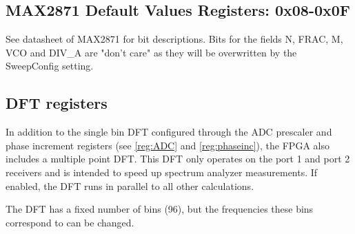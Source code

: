 \documentclass{article}
\newcommand{\bitrect}[2]{
  \begin{pgfonlayer}{foreground}
    \draw [thick] (0,0) rectangle (#1,1);
    \pgfmathsetmacro\result{#1-1}
    \foreach \x in {1,...,\result}
      \draw [thick] (\x,1) -- (\x, 0.8);
  \end{pgfonlayer}
  \bitlabels{#1}{#2}
}
\newcommand{\rwbits}[3]{
  \draw [thick] (#1,0) rectangle ++(#2,1) node[pos=0.5]{#3};
  \pgfmathsetmacro\start{#1+0.5}
  \pgfmathsetmacro\finish{#1+#2-0.5}
}
\newcommand{\bitlabels}[2]{
  \foreach \bit in {1,...,#1}{
     \pgfmathsetmacro\result{#2}
     \node [above] at (\bit-0.5, 1) {\pgfmathprintnumber{\result}};
   }
}
\begin{document}
\subsection{MAX2871 Default Values Registers: 0x08-0x0F}
See datasheet of MAX2871 for bit descriptions. Bits for the fields N, FRAC, M, VCO and DIV\_A are "don't care" as they will be overwritten by the SweepConfig setting.
\begin{center}
\end{center}

\subsection{DFT registers}
\label{dft}
In addition to the single bin DFT configured through the ADC prescaler and phase increment registers (see \ref{reg:ADC} and \ref{reg:phaseinc}), the FPGA also includes a multiple point DFT. This DFT only operates on the port 1 and port 2 receivers and is intended to speed up spectrum analyzer measurements. If enabled, the DFT runs in parallel to all other calculations.

The DFT has a fixed number of bins (96), but the frequencies these bins correspond to can be changed.
\end{document}
